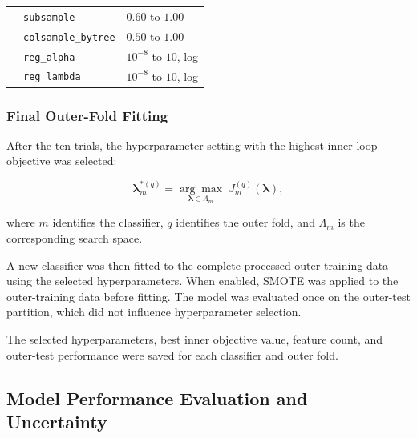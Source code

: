\documentclass[12pt,twocolumn]{article}
\begin{document}
\begin{table}[htbp]
\begin{tabularx}{\textwidth}{p{3.0cm} p{3.4cm} X}
& \texttt{subsample}
& \(0.60\) to \(1.00\) \\

& \texttt{colsample\_bytree}
& \(0.50\) to \(1.00\) \\

& \texttt{reg\_alpha}
& \(10^{-8}\) to \(10\), log \\

& \texttt{reg\_lambda}
& \(10^{-8}\) to \(10\), log \\

\bottomrule
\end{tabularx}
\end{table}

\subsubsection{Final Outer-Fold Fitting}
\label{subsubsec:final_hyperparameter_selection}

After the ten trials, the hyperparameter setting with the highest
inner-loop objective was selected:

\begin{equation}
\boldsymbol{\lambda}^{*(q)}_m
=
\underset{\boldsymbol{\lambda}\in\Lambda_m}
{\arg\max}
\;
J^{(q)}_m
\left(
\boldsymbol{\lambda}
\right),
\label{eq:best_hyperparameters}
\end{equation}

where \(m\) identifies the classifier, \(q\) identifies the outer fold,
and \(\Lambda_m\) is the corresponding search space.

A new classifier was then fitted to the complete processed
outer-training data using the selected hyperparameters. When enabled,
SMOTE was applied to the outer-training data before fitting. The model
was evaluated once on the outer-test partition, which did not influence
hyperparameter selection.

The selected hyperparameters, best inner objective value, feature
count, and outer-test performance were saved for each classifier and
outer fold.












\subsection{Model Performance Evaluation and Uncertainty}
\label{subsec:model_evaluation}
\end{document}
